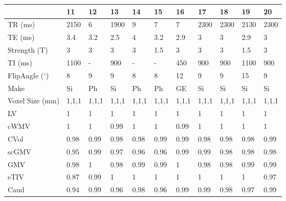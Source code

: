 \begin{table}
[]
\centering
\begin{tabular}{lllllllllll}
\toprule
{} &     11 &     12 &     13 &     14 &     15 &     16 &     17 &     18 &     19 &     20 \\
\midrule
TR (ms)                            &   2150 &      6 &   1900 &      9 &      7 &      7 &   2300 &   2300 &   2130 &   2300 \\
TE (ms)                           &    3.4 &    3.2 &    2.5 &      4 &    3.2 &    2.9 &      3 &      3 &    2.9 &      3 \\
Strength (T)                      &      3 &      3 &      3 &      3 &    1.5 &      3 &      3 &      3 &    1.5 &      3 \\
TI (ms)                           &   1100 &      - &    900 &      - &      - &    450 &    900 &    900 &   1100 &    900 \\
FlipAngle ($^{\circ}$)                     &      8 &      9 &      9 &      8 &      8 &     12 &      9 &      9 &     15 &      9 \\
Make                          &     Si &     Ph &     Si &     Ph &     Ph &     GE &     Si &     Si &     Si &     Si \\
Voxel Size (mm)                    &  1,1,1 &  1,1,1 &  1,1,1 &  1,1,1 &  1,1,1 &  1,1,1 &  1,1,1 &  1,1,1 &  1,1,1 &  1,1,1 \\
\bottomrule
LV             &      1 &      1 &      1 &      1 &      1 &      1 &      1 &      1 &      1 &      1 \\
cWMV        &      1 &      1 &   0.99 &      1 &      1 &   0.99 &      1 &      1 &      1 &      1 \\
CVol                     &   0.98 &   0.99 &   0.98 &   0.98 &   0.99 &   0.99 &   0.98 &   0.98 &   0.98 &   0.99 \\
scGMV                &   0.95 &   0.99 &   0.97 &   0.96 &   0.96 &   0.99 &   0.99 &   0.98 &   0.98 &   0.98 \\
GMV                  &   0.98 &      1 &   0.98 &   0.99 &   0.99 &      1 &   0.98 &   0.98 &   0.99 &   0.99 \\
eTIV &   0.87 &   0.99 &      1 &      1 &      1 &      1 &      1 &      1 &      1 &   0.97 \\
Caud                       &   0.94 &   0.99 &   0.96 &   0.98 &   0.96 &   0.99 &   0.99 &   0.98 &   0.97 &   0.99 \\

\end{tabular}
\end{table}
